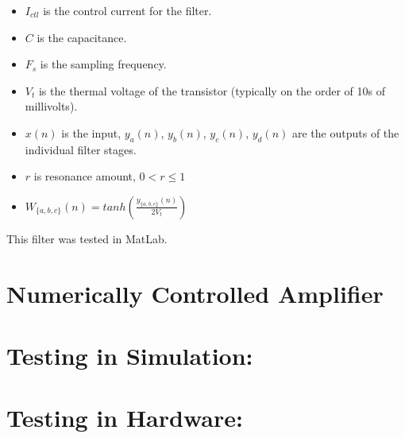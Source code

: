 \documentclass{article}
\begin{document}
    \begin{itemize}
        \item  $I_{ctl}$ is the control current for the filter.
        \item  $C$ is the capacitance.
        \item  $F_s$ is the sampling frequency.
        \item  $V_t$ is the thermal voltage of the transistor (typically on the order of 10s of millivolts).
        \item  $x(n)$ is the input, $y_a(n)$, $y_b(n)$, $y_c(n)$, $y_d(n)$ are the outputs of the individual filter stages.
        \item  $r$ is resonance amount, $0 < r \leq 1$ 
        \item  $W_{\{ a, b, c \}}(n) = tanh \left( \frac{y_{\{ a, b, c \}}(n)}{2 V_t} \right)$
    \end{itemize}


    This filter was tested in MatLab.


    \section*{Numerically Controlled Amplifier}

    \section*{Testing in Simulation:}
    
    \section*{Testing in Hardware:}
\end{document}

